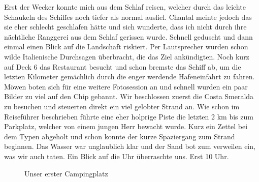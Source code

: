 Erst der Wecker konnte mich aus dem Schlaf reisen, welcher durch das leichte Schaukeln des Schiffes noch tiefer als normal ausfiel.
Chantal meinte jedoch das sie eher schlecht geschlafen hätte und sich wunderte, dass ich nicht durch ihre nächtliche Ranggerei aus dem Schlaf gerissen wurde.
Schnell geduscht und dann einmal einen Blick auf die Landschaft riskiert.
Per Lautsprecher wurden schon wilde Italienische Durchsagen überbracht, die das Ziel ankündigten.
Noch kurz auf Deck 6 das Restaurant besucht und schon bremste das Schiff ab, um die letzten Kilometer gemächlich durch die enger werdende Hafeneinfahrt zu fahren.
Möwen boten sich für eine weitere Fotosession an und schnell wurden ein paar Bilder zu viel auf den Chip gebannt.
Wir beschlossen zuerst die Costa Smeralda zu besuchen und steuerten direkt ein viel gelobter Strand an.
Wie schon im Reiseführer beschrieben führte eine eher holprige Piste die letzten 2 km bis zum Parkplatz, welcher von einem jungen Herr bewacht wurde.
Kurz ein Zettel bei dem Typen abgeholt und schon konnte der kurze Spaziergang zum Strand beginnen.
Das Wasser war unglaublich klar und der Sand bot zum verweilen ein, was wir auch taten.
Ein Blick auf die Uhr überraschte uns.
Erst 10 Uhr.

\begin{figure}[b]
   \centering
   \quad
   \quad
   \quad
   \caption[Unser erster Campingplatz]{Unser erster Campingplatz}
\end{figure}

